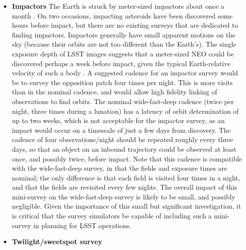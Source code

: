\begin{itemize}
\item{{\bf Impactors}}
The Earth is struck by meter-sized impactors about
once a month \citep[\eg][Trilling  submitted]{Boslough2015, 2017Icar..284..416T}. 
On two occasions, impacting asteroids have
been discovered some hours before impact, but
there are no existing surveys that are dedicated to finding
impactors.
Impactors generally have small apparent motions
on the sky (because their orbits are not too different
than the Earth's). The single exposure depth of LSST
images suggests that a meter-sized NEO could be
discovered perhaps a week before impact, given
the typical Earth-relative velocity of such a body
\citep[\eg][]{2017arXiv170506209C}.
A suggested cadence for an impactor survey would be
to survey the opposition patch four times per night.
This is more visits than in the nominal cadence, and
would allow high fidelity linking of observations to
find orbits. The nominal wide-fast-deep cadence
(twice per night, three times during a lunation) has
a latency of orbit determination of up to two weeks,
which is not acceptable for the impactor survey, as an
impact would occur on a timescale of just a few days
from discovery.
The cadence of four observations/night should be repeated
roughly every three days, so that an object on an
inbound trajectory could be observed at least once,
and possibly twice, before impact.
Note that this cadence is compatible with
the wide-fast-deep survey, in that the fields and
exposure times are nominal; the only difference is that
each field is visited four times in a night, and that
the fields are revisited every few nights. The overall
impact of this mini-survey on the wide-fast-deep
survey is likely to be small, and possibly negligible.
Given the importance of this small but
significant investigation, it is critical that the
survey simulators be capable of including such
a mini-survey in planning for LSST operations.

\item{{\bf Twilight/sweetspot survey}}


\end{itemize}
